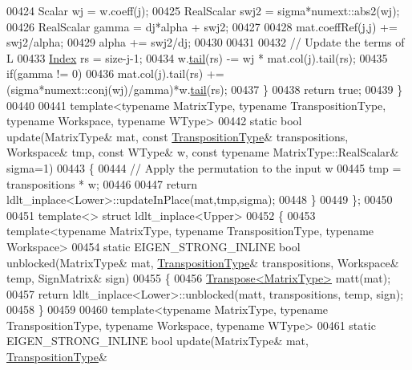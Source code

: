 \begin{DoxyCode}
00424       Scalar wj = w.coeff(j);
00425       RealScalar swj2 = sigma*numext::abs2(wj);
00426       RealScalar gamma = dj*alpha + swj2;
00427 
00428       mat.coeffRef(j,j) += swj2/alpha;
00429       alpha += swj2/dj;
00430 
00431 
00432       \textcolor{comment}{// Update the terms of L}
00433       \hyperlink{group___cholesky___module_ad9c57eb2fb3bbccd51b9d2e111bea355}{Index} rs = size-j-1;
00434       w.\hyperlink{group___core___module_aec3cf8f4f73c641d21a2c080c3e59662}{tail}(rs) -= wj * mat.col(j).tail(rs);
00435       \textcolor{keywordflow}{if}(gamma != 0)
00436         mat.col(j).tail(rs) += (sigma*numext::conj(wj)/gamma)*w.\hyperlink{group___core___module_aec3cf8f4f73c641d21a2c080c3e59662}{tail}(rs);
00437     \}
00438     \textcolor{keywordflow}{return} \textcolor{keyword}{true};
00439   \}
00440 
00441   \textcolor{keyword}{template}<\textcolor{keyword}{typename} MatrixType, \textcolor{keyword}{typename} TranspositionType, \textcolor{keyword}{typename} Workspace, \textcolor{keyword}{typename} WType>
00442   \textcolor{keyword}{static} \textcolor{keywordtype}{bool} update(MatrixType& mat, \textcolor{keyword}{const} \hyperlink{group___core___module}{TranspositionType}& transpositions, Workspace& 
      tmp, \textcolor{keyword}{const} WType& w, \textcolor{keyword}{const} \textcolor{keyword}{typename} MatrixType::RealScalar& sigma=1)
00443   \{
00444     \textcolor{comment}{// Apply the permutation to the input w}
00445     tmp = transpositions * w;
00446 
00447     \textcolor{keywordflow}{return} ldlt\_inplace<Lower>::updateInPlace(mat,tmp,sigma);
00448   \}
00449 \};
00450 
00451 \textcolor{keyword}{template}<> \textcolor{keyword}{struct }ldlt\_inplace<Upper>
00452 \{
00453   \textcolor{keyword}{template}<\textcolor{keyword}{typename} MatrixType, \textcolor{keyword}{typename} TranspositionType, \textcolor{keyword}{typename} Workspace>
00454   \textcolor{keyword}{static} EIGEN\_STRONG\_INLINE \textcolor{keywordtype}{bool} unblocked(MatrixType& mat, \hyperlink{group___core___module}{TranspositionType}& 
      transpositions, Workspace& temp, SignMatrix& sign)
00455   \{
00456     \hyperlink{group___core___module_class_eigen_1_1_transpose}{Transpose<MatrixType>} matt(mat);
00457     \textcolor{keywordflow}{return} ldlt\_inplace<Lower>::unblocked(matt, transpositions, temp, sign);
00458   \}
00459 
00460   \textcolor{keyword}{template}<\textcolor{keyword}{typename} MatrixType, \textcolor{keyword}{typename} TranspositionType, \textcolor{keyword}{typename} Workspace, \textcolor{keyword}{typename} WType>
00461   \textcolor{keyword}{static} EIGEN\_STRONG\_INLINE \textcolor{keywordtype}{bool} update(MatrixType& mat, \hyperlink{group___core___module}{TranspositionType}& 

\end{DoxyCode}
